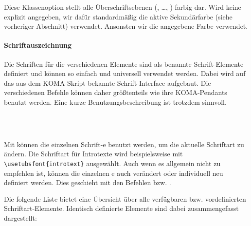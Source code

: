 \begin{Declaration}
\end{Declaration}

Diese Klassenoption stellt alle Überschriftsebenen
(, \ldots, ) farbig dar.
Wird keine  explizit angegeben, wir dafür standardmäßig die aktive
Sekundärfarbe (siehe vorheriger Abschnitt) verwendet.
Ansonsten wir die angegebene Farbe verwendet.

\paragraph{Schriftauszeichnung}
\begin{sloppypar}
Die Schriften für die verschiedenen Elemente sind als benannte Schrift-Elemente
definiert und können so einfach und universell verwendet werden.
Dabei wird auf das aus dem KOMA-Skript\cite{koma-skript} bekannte Schrift-Interface
aufgebaut. Die verschiedenen Befehle können daher größtenteils wie ihre KOMA-Pendants
benutzt werden. Eine kurze Benutzungsbeschreibung ist trotzdem sinnvoll.
\end{sloppypar}

\begin{Declaration}
  \\
  \\
\end{Declaration}

Mit  können die einzelnen Schrift-e benutzt
werden, um die aktuelle Schriftart zu ändern.
Die Schriftart für Introtexte wird beispielsweise mit\\
\lstinline!\usetubsfont{introtext}! ausgewählt.
Auch wenn es allgemein nicht zu empfehlen ist, können die einzelnen
e auch verändert oder individuell neu definiert werden.
Dies geschieht mit den Befehlen  bzw.
.


Die folgende Liste bietet eine Übersicht über alle verfügbaren bzw.
vordefinierten Schriftart-Elemente. Identisch definierte Elemente sind
dabei zusammengefasst dargestellt:

